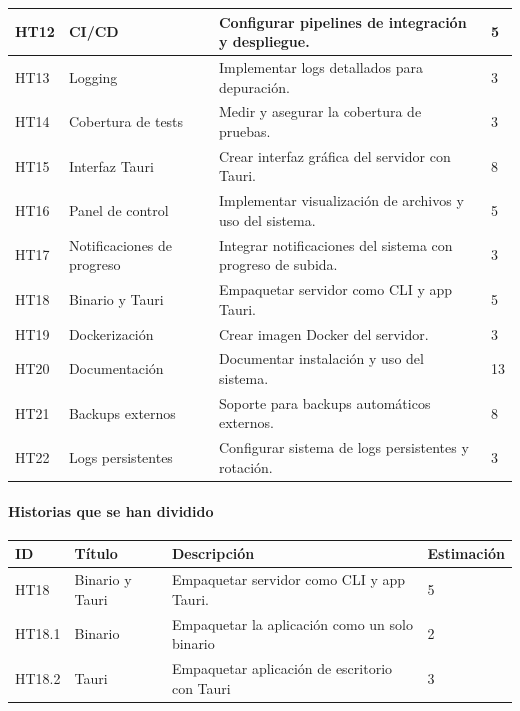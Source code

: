 \begin{tabularx}{\textwidth}{|l|l|>{\raggedright\arraybackslash}X|l|}
    \hline
    HT12 & CI/CD & Configurar pipelines de integración y despliegue. & 5 \\
    \hline
    HT13 & Logging & Implementar logs detallados para depuración. & 3 \\
    \hline
    HT14 & Cobertura de tests & Medir y asegurar la cobertura de pruebas. & 3 \\
    \hline
    HT15 & Interfaz Tauri & Crear interfaz gráfica del servidor con Tauri. & 8 \\
    \hline
    HT16 & Panel de control & Implementar visualización de archivos y uso del sistema. & 5 \\
    \hline
    HT17 & Notificaciones de progreso & Integrar notificaciones del sistema con progreso de subida. & 3 \\
    \hline
    HT18 & Binario y Tauri & Empaquetar servidor como CLI y app Tauri. & 5 \\
    \hline
    HT19 & Dockerización & Crear imagen Docker del servidor. & 3 \\
    \hline
    HT20 & Documentación & Documentar instalación y uso del sistema. & 13 \\
    \hline
    HT21 & Backups externos & Soporte para backups automáticos externos. & 8 \\
    \hline
    HT22 & Logs persistentes & Configurar sistema de logs persistentes y rotación. & 3 \\
    \hline
\end{tabularx}

\paragraph{Historias que se han dividido}

\begin{table}[H]
    \begin{center}
        \begin{tabularx}{\textwidth}{|l|l|>{\raggedright}X|l|}
            \hline
            ID & Título & Descripción & Estimación \\
            \hline
            HT18 & Binario y Tauri & Empaquetar servidor como CLI y app Tauri. & 5 \\
            \hline
            HT18.1 & Binario & Empaquetar la aplicación como un solo binario & 2 \\
            \hline
            HT18.2 & Tauri & Empaquetar aplicación de escritorio con Tauri & 3 \\
            \hline
        \end{tabularx}
    \end{center}
\end{table}

